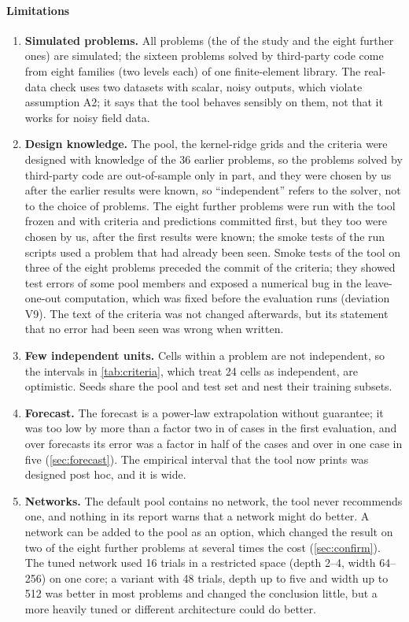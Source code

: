 \paragraph{Limitations}
\begin{enumerate}
\item \textbf{Simulated problems.} All problems (the \NAllProblems{} of the study and the eight further ones) are simulated; the sixteen problems solved by third-party code come from eight families (two levels each) of one finite-element library. The real-data check uses two datasets with scalar, noisy outputs, which violate assumption A2; it says that the tool behaves sensibly on them, not that it works for noisy field data.
\item \textbf{Design knowledge.} The pool, the kernel-ridge grids and the criteria were designed with knowledge of the 36 earlier problems, so the problems solved by third-party code are out-of-sample only in part, and they were chosen by us after the earlier results were known, so ``independent'' refers to the solver, not to the choice of problems. The eight further problems were run with the tool frozen and with criteria and predictions committed first, but they too were chosen by us, after the first results were known; the smoke tests of the run scripts used a problem that had already been seen. Smoke tests of the tool on three of the eight problems preceded the commit of the criteria; they showed test errors of some pool members and exposed a numerical bug in the leave-one-out computation, which was fixed before the evaluation runs (deviation V9). The text of the criteria was not changed afterwards, but its statement that no error had been seen was wrong when written.
\item \textbf{Few independent units.} Cells within a problem are not independent, so the intervals in \cref{tab:criteria}, which treat 24 cells as independent, are optimistic. Seeds share the pool and test set and nest their training subsets.
\item \textbf{Forecast.} The forecast is a power-law extrapolation without guarantee; it was too low by more than a factor two in \BoneUnder{} of \BoneN{} cases in the first evaluation, and over \SfAllCases{} forecasts its error was a factor \SfQHalf{} in half of the cases and over \SfQEighty{} in one case in five (\cref{sec:forecast}). The empirical interval that the tool now prints was designed post hoc, and it is wide.
\item \textbf{Networks.} The default pool contains no network, the tool never recommends one, and nothing in its report warns that a network might do better. A network can be added to the pool as an option, which changed the result on two of the eight further problems at several times the cost (\cref{sec:confirm}). The tuned network used 16 trials in a restricted space (depth 2--4, width 64--256) on one core; a variant with 48 trials, depth up to five and width up to 512 was better in most problems and changed the conclusion little, but a more heavily tuned or different architecture could do better.

\end{enumerate}

